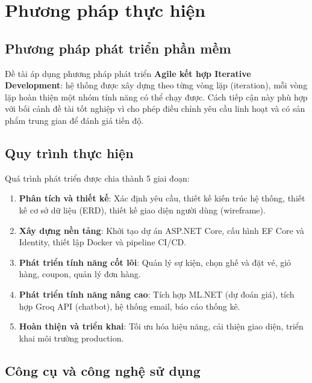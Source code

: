 \documentclass[../main.tex]{subfiles}
\begin{document}
\section{Phương pháp thực hiện}

\subsection{Phương pháp phát triển phần mềm}

Đề tài áp dụng phương pháp phát triển \textbf{Agile kết hợp Iterative Development}: hệ thống được xây dựng theo từng vòng lặp (iteration), mỗi vòng lặp hoàn thiện một nhóm tính năng có thể chạy được. Cách tiếp cận này phù hợp với bối cảnh đề tài tốt nghiệp vì cho phép điều chỉnh yêu cầu linh hoạt và có sản phẩm trung gian để đánh giá tiến độ.

\subsection{Quy trình thực hiện}

Quá trình phát triển được chia thành 5 giai đoạn:

\begin{enumerate}
    \item \textbf{Phân tích và thiết kế}: Xác định yêu cầu, thiết kế kiến trúc hệ thống, thiết kế cơ sở dữ liệu (ERD), thiết kế giao diện người dùng (wireframe).
    \item \textbf{Xây dựng nền tảng}: Khởi tạo dự án ASP.NET Core, cấu hình EF Core và Identity, thiết lập Docker và pipeline CI/CD.
    \item \textbf{Phát triển tính năng cốt lõi}: Quản lý sự kiện, chọn ghế và đặt vé, giỏ hàng, coupon, quản lý đơn hàng.
    \item \textbf{Phát triển tính năng nâng cao}: Tích hợp ML.NET (dự đoán giá), tích hợp Groq API (chatbot), hệ thống email, báo cáo thống kê.
    \item \textbf{Hoàn thiện và triển khai}: Tối ưu hóa hiệu năng, cải thiện giao diện, triển khai môi trường production.
\end{enumerate}

\subsection{Công cụ và công nghệ sử dụng}
\end{document}

